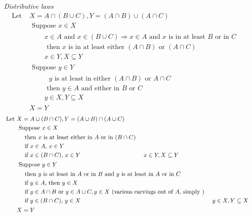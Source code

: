 \documentclass[twoside]{amsart}
\theoremstyle{plain}
\theoremstyle{definition}
\newcommand{\exercisehead}[1]
  {\smallskip
   \noindent{\small\bf Exercise #1.}}
\begin{document}
\exercisehead{10} \emph{Distributive laws }
\[
\begin{aligned}
  \text{ Let } & X = A \cap ( B \cup C), Y  = (A \cap B) \cup (A \cap C) \\
  & \text{ Suppose } x \in X \\
  & \quad \begin{aligned}
    & x \in A \text{ and } x \in (B \cup C) \Longrightarrow x \in A \text{ and $x$ is in at least $B$ or in $C$ } \\
    & \text{ then $x$ is in at least either $(A \cap B)$ or $(A \cap C)$ } \\
    & x \in Y, X \subseteq Y 
  \end{aligned} \\
  & \text{ Suppose } y \in Y \\
  & \quad \begin{aligned}
    & \text{ $y$ is at least in either $(A \cap B)$ or $A \cap C$ } \\
    & \text{ then $y \in A$ and either in $B$ or $C$ } \\
    & y \in X, Y \subseteq X
  \end{aligned} \\
  & X = Y
\end{aligned}
\]
\[
\begin{aligned}
  \text{ Let } & X = A \cup (B \cap C), Y = (A \cup B) \cap (A \cup C) \\
  & \text{ Suppose } x \in X \\
  & \quad \begin{aligned}
    & \text{ then $x$ is at least either in $A$ or in $(B \cap C)$ }
    \\
    & \text{ if $x \in A$, $x \in Y$ } \\
    & \text{ if $x \in (B \cap C)$, $x \in Y$ }
    & x \in Y, X \subseteq Y 
  \end{aligned} \\
  & \text{ Suppose } y \in Y \\
  & \quad \begin{aligned}
    & \text{ then $y$ is at least in $A$ or in $B$ and $y$ is at least in $A$ or in $C$ } \\
    & \text{ if $y \in A$, then $y \in X$ } \\
    & \text{ if $y \in A \cap B$ or $ y \in A \cup C, y \in X $ (various carvings out of $A$, simply ) } \\
    & \text{ if $y \in (B \cap C)$, $y \in X $ }
    & y \in X, Y \subseteq X 
  \end{aligned} \\
  & X = Y
\end{aligned}
\]
\end{document}
